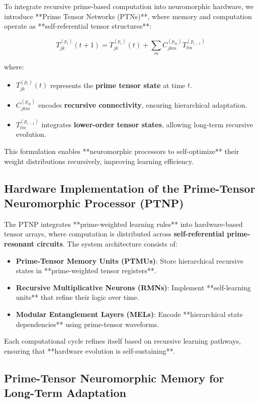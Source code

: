 \documentclass{article}
\theoremstyle{plain}
\theoremstyle{plain}
\theoremstyle{definition}
\theoremstyle{remark}
\begin{document}
To integrate recursive prime-based computation into neuromorphic hardware, we introduce **Prime Tensor Networks (PTNs)**, where memory and computation operate as **self-referential tensor structures**:

\begin{equation}
T_{jk}^{(p_i)}(t+1) = T_{jk}^{(p_i)}(t) + \sum_{m} C_{jkm}^{(p_m)} T_{lm}^{(p_{i-1})}
\end{equation}

where:
\begin{itemize}
    \item $T_{jk}^{(p_i)}(t)$ represents the \textbf{prime tensor state} at time $t$.
    \item $C_{jkm}^{(p_m)}$ encodes \textbf{recursive connectivity}, ensuring hierarchical adaptation.
    \item $T_{lm}^{(p_{i-1})}$ integrates \textbf{lower-order tensor states}, allowing long-term recursive evolution.
\end{itemize}

This formulation enables **neuromorphic processors to self-optimize** their weight distributions recursively, improving learning efficiency.

\subsection{Hardware Implementation of the Prime-Tensor Neuromorphic Processor (PTNP)}

The PTNP integrates **prime-weighted learning rules** into hardware-based tensor arrays, where computation is distributed across \textbf{self-referential prime-resonant circuits}. The system architecture consists of:
\begin{itemize}
    \item \textbf{Prime-Tensor Memory Units (PTMUs)}: Store hierarchical recursive states in **prime-weighted tensor registers**.
    \item \textbf{Recursive Multiplicative Neurons (RMNs)}: Implement **self-learning units** that refine their logic over time.
    \item \textbf{Modular Entanglement Layers (MELs)}: Encode **hierarchical state dependencies** using prime-tensor waveforms.
\end{itemize}

Each computational cycle refines itself based on recursive learning pathways, ensuring that **hardware evolution is self-sustaining**.

\subsection{Prime-Tensor Neuromorphic Memory for Long-Term Adaptation}
\end{document}
